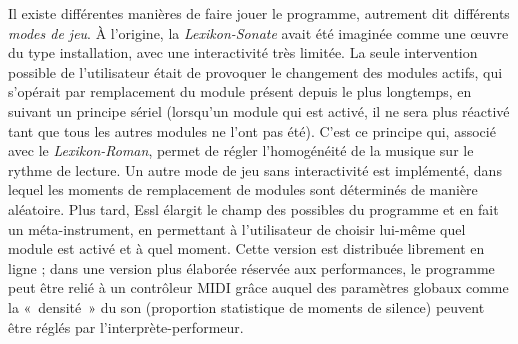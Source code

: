\documentclass[a4paper,12pt]{article}
\newcommand{\guill}[1]{«~#1~»}
\begin{document}
Il existe différentes manières de faire jouer le programme, autrement dit différents \emph{modes de jeu}. À l'origine, la \emph{Lexikon-Sonate} avait été imaginée comme une œuvre du type installation, avec une interactivité très limitée. La seule intervention possible de l'utilisateur était de provoquer le changement des modules actifs, qui s'opérait par remplacement du module présent depuis le plus longtemps, en suivant un principe sériel (lorsqu'un module qui est activé, il ne sera plus réactivé tant que tous les autres modules ne l'ont pas été). C'est ce principe qui, associé avec le \emph{Lexikon-Roman}, permet de régler l'homogénéité de la musique sur le rythme de lecture. Un autre mode de jeu sans interactivité est implémenté, dans lequel les moments de remplacement de modules sont déterminés de manière aléatoire. Plus tard, Essl élargit le champ des possibles du programme et en fait un méta-instrument, en permettant à l'utilisateur de choisir lui-même quel module est activé et à quel moment. Cette version est distribuée librement en ligne ; dans une version plus élaborée réservée aux performances, le programme peut être relié à un contrôleur MIDI grâce auquel des paramètres globaux comme la \guill{densité} du son (proportion statistique de moments de silence) peuvent être réglés par l'interprète-performeur.
\end{document}
